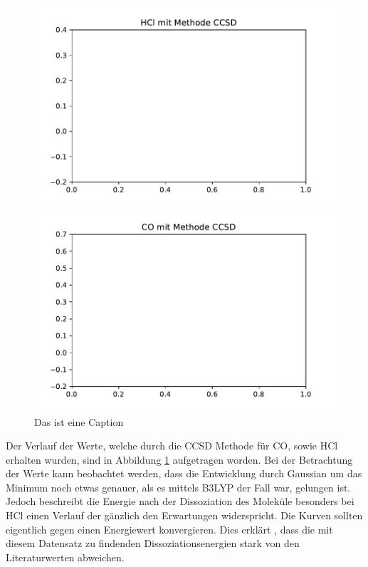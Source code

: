  
\begin{figure}[H]
	
\begin{minipage}{0.5\textwidth}
	\includegraphics[width=\textwidth]{Bilder/HCl_CCSD}
\end{minipage}
\begin{minipage}{0.5\textwidth}
	\includegraphics[width=\textwidth]{Bilder/CO_CCSD}
\end{minipage}
\caption{Das ist eine Caption}
	\label{HCl_CCSD}
\end{figure}


Der Verlauf der Werte, welche durch die CCSD Methode für CO, sowie HCl erhalten wurden, sind in Abbildung \ref{HCl_CCSD} aufgetragen worden. Bei der Betrachtung der Werte kann beobachtet werden, dass die Entwicklung durch Gaussian um das Minimum noch etwas genauer, als es mittels B3LYP der Fall war, gelungen ist. Jedoch beschreibt die Energie  nach der Dissoziation des Moleküle besonders bei HCl einen Verlauf der gänzlich den Erwartungen widerspricht. Die Kurven sollten eigentlich gegen einen Energiewert konvergieren. Dies erklärt , dass die mit diesem Datensatz zu findenden Dissoziationsenergien stark von den Literaturwerten abweichen.










%
